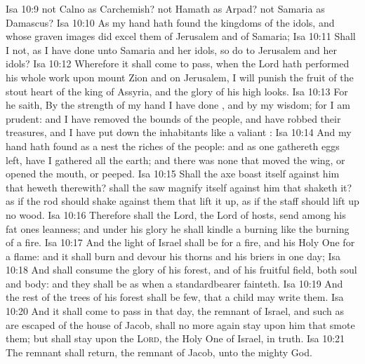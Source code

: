 \vs Isa 10:9  not Calno as Carchemish?  not Hamath as Arpad?  not Samaria as Damascus?
\vs Isa 10:10 As my hand hath found the kingdoms of the idols, and whose graven images did excel them of Jerusalem and of Samaria;
\vs Isa 10:11 Shall I not, as I have done unto Samaria and her idols, so do to Jerusalem and her idols?
\vs Isa 10:12 Wherefore it shall come to pass,  when the Lord hath performed his whole work upon mount Zion and on Jerusalem, I will punish the fruit of the stout heart of the king of Assyria, and the glory of his high looks.
\vs Isa 10:13 For he saith, By the strength of my hand I have done , and by my wisdom; for I am prudent: and I have removed the bounds of the people, and have robbed their treasures, and I have put down the inhabitants like a valiant :
\vs Isa 10:14 And my hand hath found as a nest the riches of the people: and as one gathereth eggs  left, have I gathered all the earth; and there was none that moved the wing, or opened the mouth, or peeped.
\vs Isa 10:15 Shall the axe boast itself against him that heweth therewith?  shall the saw magnify itself against him that shaketh it? as if the rod should shake  against them that lift it up,  as if the staff should lift up  no wood.
\vs Isa 10:16 Therefore shall the Lord, the Lord of hosts, send among his fat ones leanness; and under his glory he shall kindle a burning like the burning of a fire.
\vs Isa 10:17 And the light of Israel shall be for a fire, and his Holy One for a flame: and it shall burn and devour his thorns and his briers in one day;
\vs Isa 10:18 And shall consume the glory of his forest, and of his fruitful field, both soul and body: and they shall be as when a standardbearer fainteth.
\vs Isa 10:19 And the rest of the trees of his forest shall be few, that a child may write them.
\vs Isa 10:20 And it shall come to pass in that day,  the remnant of Israel, and such as are escaped of the house of Jacob, shall no more again stay upon him that smote them; but shall stay upon the \textsc{Lord}, the Holy One of Israel, in truth.
\vs Isa 10:21 The remnant shall return,  the remnant of Jacob, unto the mighty God.
